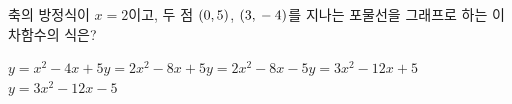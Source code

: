 축의 방정식이 $x=2$이고, 두 점 $(0{,}\mkern3mu 5)$, $(3{,}\mkern3mu -4)$를 지나는 포물선을 그래프로 하는 이차함수의 식은?
\begin{choicesii}{$y=x^2-4x+5$}{$y=2x^2-8x+5$}{$y=2x^2-8x-5$}{$y=3x^2-12x+5$}{$y=3x^2-12x-5$}\end{choicesii}
